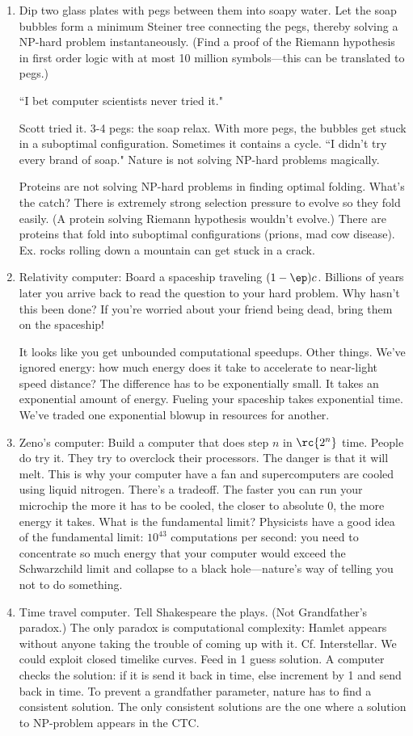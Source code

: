 \begin{enumerate}
\item
Dip two glass plates with pegs between them into soapy water. Let the soap bubbles form a minimum Steiner tree connecting the pegs, thereby solving a NP-hard problem instantaneously. (Find a proof of the Riemann hypothesis in first order logic with at most 10 million symbols---this can be translated to pegs.)

``I bet computer scientists never tried it."

Scott tried it. 3-4 pegs: the soap relax. With more pegs, the bubbles get stuck in a suboptimal configuration. Sometimes it contains a cycle. ``I didn't try every brand of soap." Nature is not solving NP-hard problems magically. 

Proteins are not solving NP-hard problems in finding optimal folding. What's the catch? There is extremely strong selection pressure to evolve so they fold easily. (A protein solving Riemann hypothesis wouldn't evolve.)
There are proteins that fold into suboptimal configurations (prions, mad cow disease). Ex. rocks rolling down a mountain can get stuck in a crack.
\item
Relativity computer: Board a spaceship traveling $(1-\ep)c$. Billions of years later you arrive back to read the question to your hard problem. Why hasn't this been done? If you're worried about your friend being dead, bring them on the spaceship!

It looks like you get unbounded computational speedups. Other things. We've ignored energy: how much energy does it take to accelerate to near-light speed distance? The difference has to be exponentially small. It takes an exponential amount of energy. Fueling your spaceship takes exponential time. We've traded one exponential blowup in resources for another.
\item
Zeno's computer: Build a computer that does step $n$ in $\rc{2^n}$ time. 
People do try it. They try to overclock their processors. The danger is that it will melt. This is why your computer have a fan and supercomputers are cooled using liquid nitrogen. There's a tradeoff. The faster you can run your microchip the more it has to be cooled, the closer to absolute 0, the more energy it takes. What is the fundamental limit? Physicists have a good idea of the fundamental limit: 
$10^{43}$ computations per second: you need to concentrate so much energy that your computer would exceed the Schwarzchild limit and collapse to a black hole---nature's way of telling you not to do something.
\item
Time travel computer. Tell Shakespeare the plays. (Not Grandfather's paradox.) The only paradox is computational complexity: Hamlet appears without anyone taking the trouble of coming up with it. 
Cf. Interstellar.
We could exploit closed timelike curves. Feed in 1 guess solution. A computer checks the solution: if it is send it back in time, else increment by 1 and send back in time. To prevent a grandfather parameter, nature has to find a consistent solution. The only consistent solutions are the one where a solution to NP-problem appears in the CTC.


\end{enumerate}
